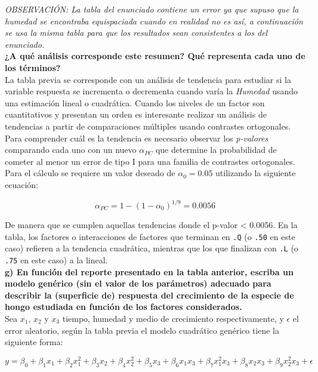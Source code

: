 \documentclass[11pt]{article}
\begin{document}
\emph{OBSERVACIÓN: La tabla del enunciado contiene un error ya que
supuso que la humedad se encontraba equispaciada cuando en realidad no
es así, a continuación se usa la misma tabla para que los resultados sean consistentes a los del enunciado.}\\
    
\textbf{¿A qué análisis corresponde este resumen? Qué representa cada uno de los términos?}\\

La tabla previa se corresponde con un análisis de tendencia para estudiar si la variable respuesta se incrementa o decrementa cuando varía la \emph{Humedad} usando una estimación lineal o cuadrática. 
Cuando los niveles de un factor son cuantitativos y presentan un orden es interesante realizar un análisis de tendencias a partir de comparaciones múltiples usando contrastes ortogonales.\\

Para comprender cuál es la tendencia es necesario observar los
\emph{p-valores} comparando cada uno con un nuevo \(\alpha_{PC}\) que determine la probabilidad de cometer al menor un error de tipo I para una familia de contrastes ortogonales. Para el cálculo se requiere un valor deseado de \(\alpha_0 = 0.05\) utilizando la siguiente ecuación:

\[\alpha_{PC} = 1 - (1- \alpha_0)^{1/9} = 0.0056\]

De manera que se cumplen aquellas tendencias donde el p-valor < 0.0056.
En la tabla, los factores o interacciones de factores que terminan en
\texttt{.Q} (o \texttt{.50} en este caso) refieren a la tendencia cuadrática, mientras que los que finalizan con \texttt{.L} (o \texttt{.75} en este caso) a la lineal.\\

    \textbf{g) En función del reporte presentado en la tabla anterior,
escriba un modelo genérico (sin el valor de los parámetros) adecuado
para describir la (superficie de) respuesta del crecimiento de la
especie de hongo estudiada en función de los factores considerados.}\\

Sea \(x_1\), \(x_2\) y \(x_3\) tiempo, humedad y medio de crecimiento
respectivamente, y \(\epsilon\) el error aleatorio, según la tabla
previa el modelo cuadrático genérico tiene la siguiente forma:

\[y = \beta_0 + \beta_1x_1 + \beta_2x_1^2 + \beta_3x_2 + \beta_4x_2^2 + \beta_5x_3 + \beta_6 x_1 x_3 + \beta_7 x_1^2 x_3 + \beta_8 x_2 x_3 + \beta_9 x_2 ^2 x_3 + \epsilon\]
\end{document}
